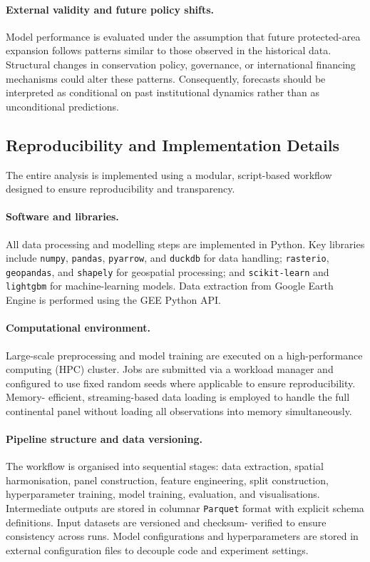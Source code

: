 \documentclass[12pt]{article}
\theoremstyle{break} %
\begin{document}
\paragraph{External validity and future policy shifts.}
Model performance is evaluated under the assumption that future protected-area expansion follows patterns similar to those observed in the historical data. Structural changes in conservation policy, governance, or international financing mechanisms could alter these patterns. Consequently, forecasts should be interpreted as conditional on past institutional dynamics rather than as unconditional predictions.

\subsection{Reproducibility and Implementation Details}
\label{reproducibility}

The entire analysis is implemented using a modular, script-based workflow designed to ensure reproducibility and transparency.

\paragraph{Software and libraries.}
All data processing and modelling steps are implemented in Python. Key libraries include \texttt{numpy}, \texttt{pandas}, \texttt{pyarrow}, and \texttt{duckdb} for data handling; \texttt{rasterio}, \texttt{geopandas}, and \texttt{shapely} for geospatial processing; and \texttt{scikit-learn} and \texttt{lightgbm} for machine-learning models. Data extraction from Google Earth Engine is performed using the GEE Python API.

\paragraph{Computational environment.}
Large-scale preprocessing and model training are executed on a high-performance computing (HPC) cluster. Jobs are submitted via a workload manager and configured to use fixed random seeds where applicable to ensure reproducibility. Memory- efficient, streaming-based data loading is employed to handle the full continental panel without loading all observations into memory simultaneously.

\paragraph{Pipeline structure and data versioning.}
The workflow is organised into sequential stages: data extraction, spatial harmonisation, panel construction, feature engineering, split construction, hyperparameter training, model training, evaluation, and visualisations. Intermediate outputs are stored in columnar \texttt{Parquet} format with explicit schema definitions. Input datasets are versioned and checksum- verified to ensure consistency across runs. Model configurations and hyperparameters are stored in external configuration files to decouple code and experiment settings.
\end{document}

